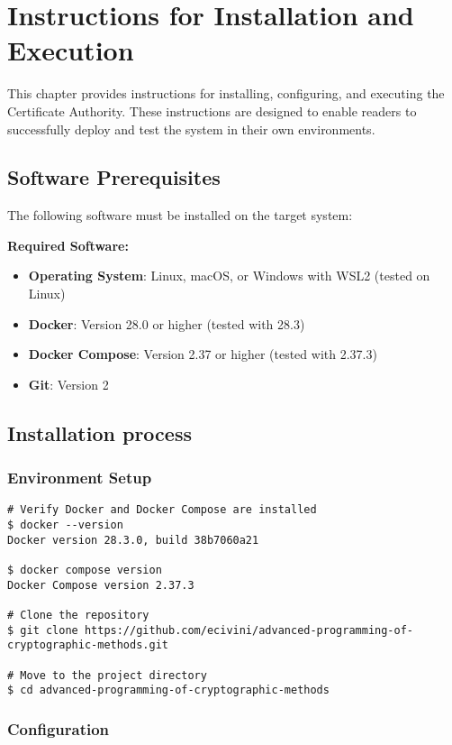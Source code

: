 \chapter{Instructions for Installation and Execution}

This chapter provides instructions for installing, configuring, and executing the 
Certificate Authority. These instructions are designed to enable readers to successfully 
deploy and test the system in their own environments.

\section{Software Prerequisites}

The following software must be installed on the target system:

\textbf{Required Software:}
\begin{itemize}
    \item \textbf{Operating System}: Linux, macOS, or Windows with WSL2 (tested on Linux)
    \item \textbf{Docker}: Version 28.0 or higher (tested with 28.3)
    \item \textbf{Docker Compose}: Version 2.37 or higher (tested with 2.37.3)
    \item \textbf{Git}: Version 2
\end{itemize}

\section{Installation process}

\subsection{Environment Setup}
\begin{verbatim}
# Verify Docker and Docker Compose are installed
$ docker --version
Docker version 28.3.0, build 38b7060a21

$ docker compose version
Docker Compose version 2.37.3

# Clone the repository 
$ git clone https://github.com/ecivini/advanced-programming-of-cryptographic-methods.git

# Move to the project directory
$ cd advanced-programming-of-cryptographic-methods
\end{verbatim}

\subsection{Configuration}

